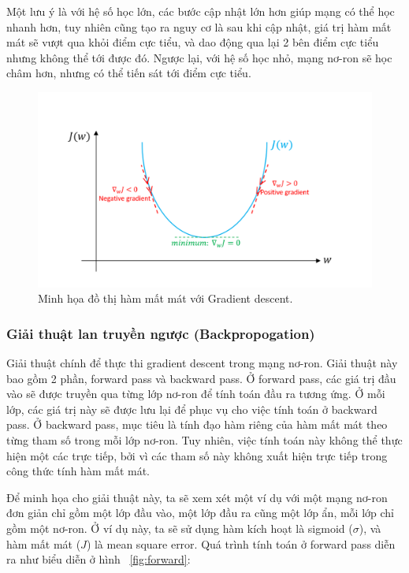 \documentclass[a4paper,14pt]{extreport}
\begin{document}
Một lưu ý là với hệ số học lớn, các bước cập nhật lớn hơn giúp mạng có thể học nhanh hơn, tuy nhiên cũng tạo ra nguy cơ là sau khi cập nhật, giá trị hàm mất mát sẽ vượt qua khỏi điểm cực tiểu, và dao động qua lại 2 bên điểm cực tiểu nhưng không thể tới được đó. Ngược lại, với hệ số học nhỏ,  mạng nơ-ron sẽ học châm hơn, nhưng có thể tiến sát tới điểm cực tiểu.

\begin{figure}
    \centering
    \includegraphics[scale=0.3]{img/gradient-descent.png}
    \caption{Minh họa đồ thị hàm mất mát với Gradient descent. \cite{gradient-descent}}
    \label{fig:gradient}
\end{figure}
 
\subsubsection*{ Giải thuật lan truyền ngược (Backpropogation) }

Giải thuật chính để thực thi gradient descent trong mạng nơ-ron. Giải thuật này bao gồm 2 phần, forward pass 
và backward pass. Ở forward pass, các giá trị đầu vào sẽ được truyền qua từng lớp nơ-ron để tính toán đầu 
ra tương ứng. Ở mỗi lớp, các giá trị này sẽ được lưu lại để phục vụ cho việc tính toán ở backward pass. 
Ở backward pass, mục tiêu là tính đạo hàm riêng của hàm mất mát theo từng tham số trong mỗi lớp nơ-ron. 
Tuy nhiên, việc tính toán này không thể thực hiện một các trực tiếp, bởi vì các tham số này không xuất hiện 
trực tiếp trong công thức tính hàm mất mát.

Để minh họa cho giải thuật này, ta sẽ xem xét một ví dụ với một mạng nơ-ron đơn giản chỉ gồm một lớp đầu vào, 
một lớp đầu ra cũng một lớp ẩn, mỗi lớp chỉ gồm một nơ-ron. Ở ví dụ này, ta sẽ sử dụng hàm kích hoạt là 
sigmoid ($\sigma$), và hàm mất mát ($J$) là mean square error. Quá trình tính toán ở forward pass diễn ra như biểu diễn ở hình ~\ref{fig:forward}:
\end{document}
